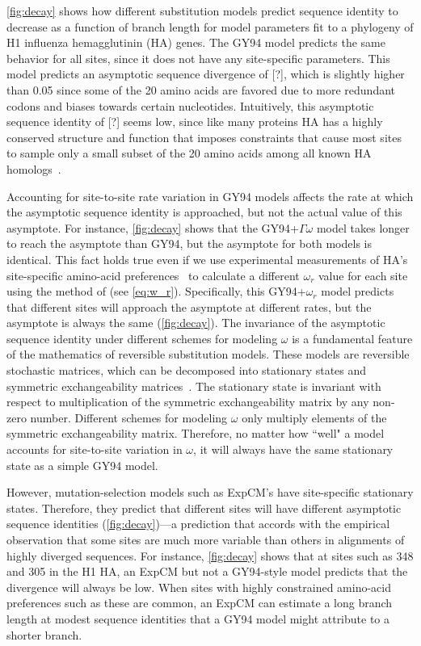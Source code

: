 \documentclass[11pt]{article}
\newcommand\jdbcomment[1]{{\color{red}[#1]}}
\begin{document}
\ref{fig:decay} shows how different substitution models predict sequence identity to decrease as a function of branch length for model parameters fit to a phylogeny of H1 influenza hemagglutinin (HA) genes.
The GY94 model predicts the same behavior for all sites, since it does not have any site-specific parameters.
This model predicts an asymptotic sequence divergence of \jdbcomment{?}, which is slightly higher than 0.05 since some of the 20 amino acids are favored due to more redundant codons and biases towards certain nucleotides.
Intuitively, this asymptotic sequence identity of \jdbcomment{?} seems low, since like many proteins HA has a highly conserved structure and function that imposes constraints that cause most sites to sample only a small subset of the 20 amino acids among all known HA homologs~\citep{nobusawa1991comparison}.

Accounting for site-to-site rate variation in GY94 models affects the rate at which the asymptotic sequence identity is approached, but not the actual value of this asymptote. 
For instance, \ref{fig:decay} shows that the GY94+$\Gamma\omega$ model takes longer to reach the asymptote than GY94, but the asymptote for both models is identical. 
This fact holds true even if we use experimental measurements of HA's site-specific amino-acid preferences~\citep{doud2016accurate} to calculate a different $\omega_r$ value for each site using the method of \citet{spielman2015relationship} (see \ref{eq:w_r}).
Specifically, this GY94+$\omega_r$ model predicts that different sites will approach the asymptote at different rates, but the asymptote is always the same (\ref{fig:decay}).
The invariance of the asymptotic sequence identity under different schemes for modeling $\omega$ is a fundamental feature of the mathematics of reversible substitution models.
These models are reversible stochastic matrices, which can be decomposed into stationary states and symmetric exchangeability matrices~\citep{nielsen2006statistical}.
The stationary state is invariant with respect to multiplication of the symmetric exchangeability matrix by any non-zero number.
Different schemes for modeling $\omega$ only multiply elements of the symmetric exchangeability matrix.
Therefore, no matter how ``well" a model accounts for site-to-site variation in $\omega$, it will always have the same stationary state as a simple GY94 model. 

However, mutation-selection models such as ExpCM's have site-specific stationary states.
Therefore, they predict that different sites will have different asymptotic sequence identities (\ref{fig:decay})---a prediction that accords with the empirical observation that some sites are much more variable than others in alignments of highly diverged sequences.
For instance, \ref{fig:decay} shows that at sites such as 348 and 305 in the H1 HA, an ExpCM but not a GY94-style model predicts that the divergence will always be low. 
When sites with highly constrained amino-acid preferences such as these are common, an ExpCM can estimate a long branch length at modest sequence identities that a GY94 model might attribute to a shorter branch.
\end{document}
